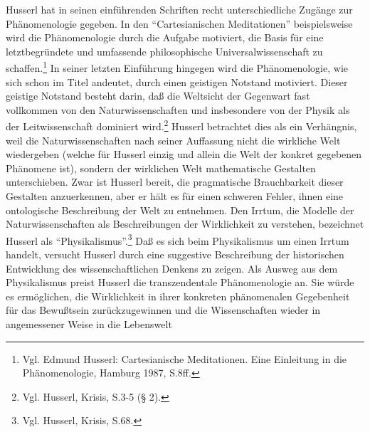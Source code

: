 Husserl hat in seinen einführenden Schriften recht unterschiedliche Zugänge
zur Phänomenologie gegeben. In den "`Cartesianischen Meditationen"'
beispielsweise wird die Phänomenologie durch die Aufgabe motiviert, die Basis
für eine letztbegründete und umfassende philosophische Universalwissenschaft
zu schaffen.\footnote{Vgl. Edmund Husserl: Cartesianische Meditationen. Eine
  Einleitung in die Phänomenologie, Hamburg 1987, S.8ff.} In seiner letzten
Einführung hingegen wird die Phänomenologie, wie sich schon im Titel andeutet,
durch einen geistigen Notstand motiviert. Dieser geistige Notstand besteht
darin, daß die Weltsicht der Gegenwart fast vollkommen von den
Naturwissenschaften und insbesondere von der Physik als der Leitwissenschaft
dominiert wird.\footnote{Vgl. Husserl, Krisis, S.3-5 (§ 2).} Husserl
betrachtet dies als ein Verhängnis, weil die Naturwissenschaften nach seiner
Auf\/fassung nicht die wirkliche Welt wiedergeben (welche für Husserl einzig und
allein die Welt der konkret gegebenen Phänomene ist), sondern der wirklichen
Welt mathematische Gestalten unterschieben. Zwar ist Husserl bereit, die
pragmatische Brauchbarkeit dieser Gestalten anzuerkennen, aber er hält es für
einen schweren Fehler, ihnen eine ontologische Beschreibung der Welt zu
entnehmen. Den Irrtum, die Modelle der Naturwissenschaften als Beschreibungen
der Wirklichkeit zu verstehen, bezeichnet Husserl als
"`Physikalismus"'.\footnote{Vgl. Husserl, Krisis, S.68.} Daß es sich beim
Physikalismus um einen Irrtum handelt, versucht Husserl durch eine suggestive
Beschreibung der historischen Entwicklung des wissenschaftlichen Denkens zu
zeigen. Als Ausweg aus dem Physikalismus preist Husserl die transzendentale
Phänomenologie an. Sie würde es ermöglichen, die Wirklichkeit in ihrer
konkreten phänomenalen Gegebenheit für das Bewußtsein zurückzugewinnen und
die Wissenschaften wieder in angemessener Weise in die Lebenswelt
